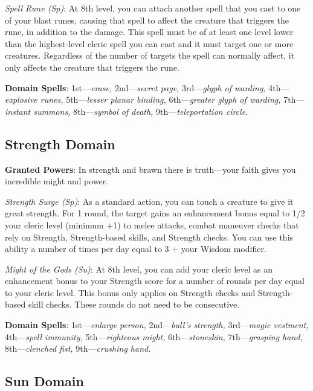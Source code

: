\textit{Spell Rune (Sp)}: At 8th level, you can attach another spell that you cast to one of your blast runes, causing that spell to affect the creature that triggers the rune, in addition to the damage. This spell must be of at least one level lower than the highest-level cleric spell you can cast and it must target one or more creatures. Regardless of the number of targets the spell can normally affect, it only affects the creature that triggers the rune.
				
\textbf{Domain Spells}: 1st---\textit{erase, }2nd---\textit{secret page,} 3rd---\textit{glyph of warding, }4th---\textit{explosive runes, }5th---\textit{lesser planar binding, }6th---\textit{greater glyph of warding, }7th---\textit{instant summons, }8th---\textit{symbol of death, }9th---\textit{teleportation circle}.
				
\subsection{Strength Domain}

				
\textbf{Granted Powers}: In strength and brawn there is truth---your faith gives you incredible might and power. 
				
\textit{Strength Surge (Sp)}: As a standard action, you can touch a creature to give it great strength. For 1 round, the target gains an enhancement bonus equal to 1/2 your cleric level (minimum +1) to melee attacks, combat maneuver checks that rely on Strength, Strength-based skills, and Strength checks. You can use this ability a number of times per day equal to 3 + your Wisdom modifier.
				
\textit{Might of the Gods (Su)}: At 8th level, you can add your cleric level as an enhancement bonus to your Strength score for a number of rounds per day equal to your cleric level. This bonus only applies on Strength checks and Strength-based skill checks. These rounds do not need to be consecutive.
				
\textbf{Domain Spells}: 1st---\textit{enlarge person, }2nd---\textit{bull's strength,} 3rd---\textit{magic vestment, }4th---\textit{spell immunity, }5th---\textit{righteous might, }6th---\textit{stoneskin, }7th---\textit{grasping hand, }8th---\textit{clenched fist, }9th---\textit{crushing hand.}
				
\subsection{Sun Domain}

